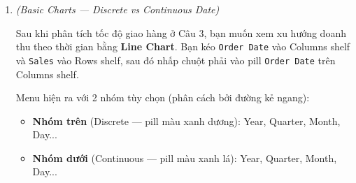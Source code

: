 \documentclass[12pt]{article}
\begin{document}
\begin{enumerate}[label=\textbf{Câu \arabic*.}, leftmargin=*, labelsep=1em, itemsep=2em]
\begin{guidelinebox}
\begin{itemize}
    \item \textbf{Choice (b) đúng:} Cách đọc chính xác. Khi kéo \texttt{[Delivery Speed]} vào Color với Mark Type = Area, Tableau tạo biểu đồ xếp chồng: Fast bắt đầu từ y=0, Normal xếp \textbf{trên} Fast, Slow xếp \textbf{trên cùng}. Nhìn trên trục Y, đường biên trên cùng chạm \$120,000 = tổng \texttt{SUM(Sales)} cả 3 nhóm. Đây là "cạm bẫy" phổ biến nhất: người xem dễ nhầm đường biên trên cùng là doanh thu riêng của nhóm trên cùng.

    \item \textbf{Choice (c) sai:} Stacked Area Chart mặc định hiển thị giá trị \textbf{tuyệt đối} (\texttt{SUM(Sales)} bằng đô-la), \textbf{không phải} phần trăm. Trục Y hiển thị giá trị \$ thực tế. Để có dạng \% (tổng = 100\%), cần thêm bước: chuột phải vào \texttt{SUM(Sales)} $\rightarrow$ \textbf{Quick Table Calculation} $\rightarrow$ \textbf{Percent of Total}.

    \item \textbf{Choice (d) sai:} Thứ tự nhóm trong Stacked Area Chart được \textbf{cố định} theo legend --- Tableau \textbf{không} tự động xếp lại thứ tự các vùng dựa trên giá trị doanh thu. Thứ tự \textbf{giữ nguyên xuyên suốt} toàn bộ trục thời gian. Muốn thay đổi $\rightarrow$ kéo thủ công trong legend.
\end{itemize}

\end{guidelinebox}

\newpage


\item \textit{(Basic Charts --- Discrete vs Continuous Date)}

Sau khi phân tích tốc độ giao hàng ở Câu 3, bạn muốn xem xu hướng doanh thu theo thời gian bằng \textbf{Line Chart}. Bạn kéo \texttt{Order Date} vào Columns shelf và \texttt{Sales} vào Rows shelf, sau đó nhấp chuột phải vào pill \texttt{Order Date} trên Columns shelf.

Menu hiện ra với 2 nhóm tùy chọn (phân cách bởi đường kẻ ngang):
\begin{itemize}
    \item \textbf{Nhóm trên} (Discrete --- pill màu xanh dương): Year, Quarter, Month, Day...
    \item \textbf{Nhóm dưới} (Continuous --- pill màu xanh lá): Year, Quarter, Month, Day...
\end{itemize}


\end{enumerate}
\end{document}
